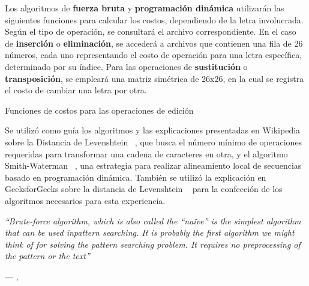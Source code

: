 Los algoritmos de \textbf{fuerza bruta} y \textbf{programación dinámica} utilizarán las siguientes funciones para calcular los costos, dependiendo de la letra involucrada. Según el tipo de operación, se consultará el archivo correspondiente. En el caso de \textbf{inserción} o \textbf{eliminación}, se accederá a archivos que contienen una fila de 26 números, cada uno representando el costo de operación para una letra específica, determinado por su índice. Para las operaciones de \textbf{sustitución} o \textbf{transposición}, se empleará una matriz simétrica de 26x26, en la cual se registra el costo de cambiar una letra por otra. 

\begin{algorithm}[H]
    
    \DontPrintSemicolon
    \footnotesize
    
    
    
    
    
    
    \caption{Funciones de costos para las operaciones de edición}
    \label{alg:funcionesCostos}
\end{algorithm}


Se utilizó como guía los algoritmos y las explicaciones presentadas en Wikipedia sobre la Distancia de Levenshtein ~\cite{eswiki:157799255}, que busca el número mínimo de operaciones requeridas para transformar una cadena de caracteres en otra, y el algoritmo Smith-Waterman ~\cite{eswiki:160948078}, una estrategia para realizar alineamiento local de secuencias basado en programación dinámica. También se utilizó la explicación en GeeksforGeeks sobre la distancia de Levenshtein ~\cite{zaidkhan15_levenshtein} para la confección de los algoritmos necesarios para esta experiencia.

\epigraph{\textit{``Brute-force algorithm, which is also called the “naïve” is the simplest algorithm that can be used inpattern searching. It is probably the first algorithm we might think of for solving the pattern searching problem. It requires no preprocessing of the pattern or the text''}} {--- \citeauthor{mohammad2006occurrences}, \citeyear{mohammad2006occurrences} \cite{mohammad2006occurrences}}



